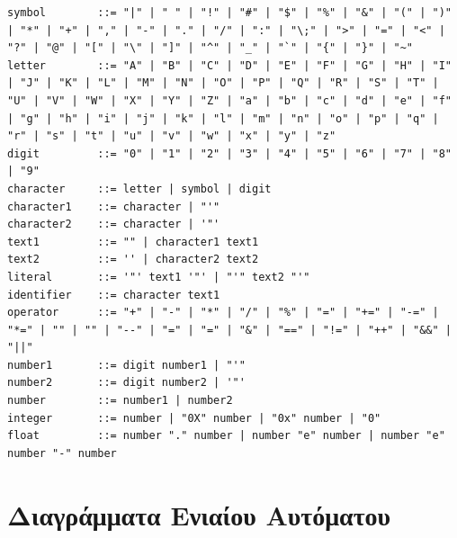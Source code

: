 \documentclass[14pt]{extarticle}
\begin{document}
    \begin{lstlisting}[bnf]
symbol        ::= "|" | " " | "!" | "#" | "$" | "%" | "&" | "(" | ")" | "*" | "+" | "," | "-" | "." | "/" | ":" | "\;" | ">" | "=" | "<" | "?" | "@" | "[" | "\" | "]" | "^" | "_" | "`" | "{" | "}" | "~"
letter        ::= "A" | "B" | "C" | "D" | "E" | "F" | "G" | "H" | "I" | "J" | "K" | "L" | "M" | "N" | "O" | "P" | "Q" | "R" | "S" | "T" | "U" | "V" | "W" | "X" | "Y" | "Z" | "a" | "b" | "c" | "d" | "e" | "f" | "g" | "h" | "i" | "j" | "k" | "l" | "m" | "n" | "o" | "p" | "q" | "r" | "s" | "t" | "u" | "v" | "w" | "x" | "y" | "z"
digit         ::= "0" | "1" | "2" | "3" | "4" | "5" | "6" | "7" | "8" | "9"
character     ::= letter | symbol | digit
character1    ::= character | "'"
character2    ::= character | '"'
text1         ::= "" | character1 text1
text2         ::= '' | character2 text2
literal       ::= '"' text1 '"' | "'" text2 "'"
identifier    ::= character text1
operator      ::= "+" | "-" | "*" | "/" | "%" | "=" | "+=" | "-=" | "*=" | "" | "" | "--" | "=" | "=" | "&" | "==" | "!=" | "++" | "&&" | "||"
number1       ::= digit number1 | "'"
number2       ::= digit number2 | '"'
number        ::= number1 | number2
integer       ::= number | "0X" number | "0x" number | "0"  
float         ::= number "." number | number "e" number | number "e" number "-" number
    \end{lstlisting}



\clearpage
\section{Διαγράμματα Ενιαίου Αυτόματου}
\end{document}
